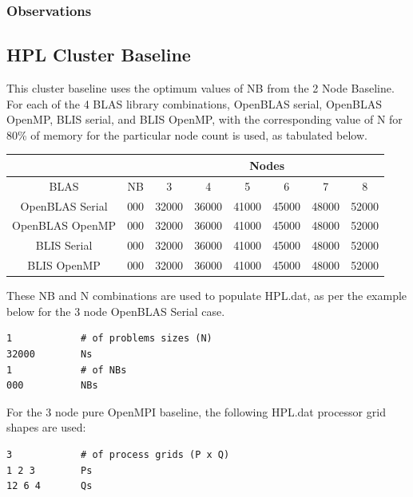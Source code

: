 \documentclass{report}
\begin{document}
%
%
\subsubsection{Observations}




%
%
\subsection{HPL Cluster Baseline}

This cluster baseline uses the optimum values of NB from the 2 Node Baseline. For each of the 4 BLAS library combinations, OpenBLAS serial, OpenBLAS OpenMP, BLIS serial, and BLIS OpenMP, with the corresponding value of N for 80\% of memory for the particular node count is used, as tabulated below.

\begin{center}
	\begin{tabular}{ |c|c|c|c|c|c|c|c| } 
		\hline
		\multicolumn{2}{|c|}{} & \multicolumn{6}{c|}{Nodes} \\
		\hline
		BLAS & NB & 3 & 4 & 5 & 6 & 7 & 8 \\ 
		\hline
		OpenBLAS Serial & 000 & 32000 & 36000 & 41000 & 45000 & 48000 & 52000 \\ 
		OpenBLAS OpenMP & 000 & 32000 & 36000 & 41000 & 45000 & 48000 & 52000 \\ 
 		BLIS Serial     & 000 & 32000 & 36000 & 41000 & 45000 & 48000 & 52000 \\
		BLIS OpenMP     & 000 & 32000 & 36000 & 41000 & 45000 & 48000 & 52000 \\ 
 		\hline
	\end{tabular}
\end{center}

These NB and N combinations are used to populate HPL.dat, as per the example below for the 3 node OpenBLAS Serial case.

\lstset{style=listing}
\begin{lstlisting}[numbers=none]
1            # of problems sizes (N)
32000        Ns
1            # of NBs
000          NBs
\end{lstlisting}

For the 3 node pure OpenMPI baseline, the following HPL.dat processor grid shapes are used: 

\lstset{style=listing}
\begin{lstlisting}[numbers=none]
3            # of process grids (P x Q)
1 2 3        Ps
12 6 4       Qs
\end{lstlisting}
\end{document}
